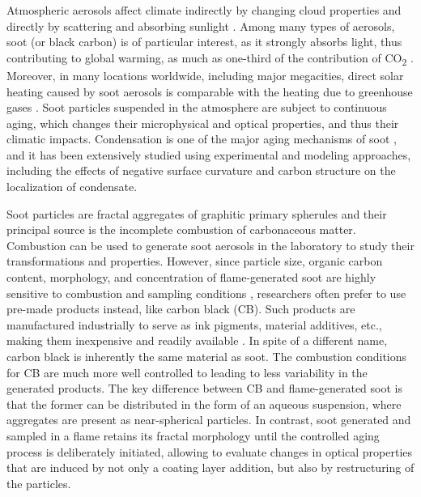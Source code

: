 Atmospheric aerosols affect climate indirectly by changing cloud properties \citep{lohmann2005global,tao2012impact} and directly by scattering and absorbing sunlight \citep{chylek1995effect}. Among many types of aerosols, soot (or black carbon) is of particular interest, as it strongly absorbs light, thus contributing to global warming, as much as one-third of the contribution of CO\textsubscript{2} \citep{RN21}. Moreover, in many locations worldwide, including major megacities, direct solar heating caused by soot aerosols is comparable with the heating due to greenhouse gases \citep{RN45}. Soot particles suspended in the atmosphere are subject to continuous aging, which changes their microphysical and optical properties, and thus their climatic impacts. Condensation is one of the major aging mechanisms of soot \citep{saathoff2003coating}, and it has been extensively studied using experimental and modeling approaches, including the effects of negative surface curvature \citep{RN70,ivanova2020kinetic} and carbon structure \citep{ivanova2022molecular} on the localization of condensate.







Soot particles are fractal aggregates of graphitic primary spherules and their principal source is the incomplete combustion of carbonaceous matter. Combustion can be used to generate soot aerosols in the laboratory to study their transformations and properties. However, since particle size, organic carbon content, morphology, and concentration of flame-generated soot are highly sensitive to combustion and sampling conditions \citep{RN46,RN47}, researchers often prefer to use pre-made products instead, like carbon black (CB). Such products are manufactured industrially to serve as ink pigments, material additives, etc., making them inexpensive and readily available \citep{RN12}. In spite of a different name, carbon black is inherently the same material as soot. The combustion conditions for CB are much more well controlled to leading to less variability in the generated products. The key difference between CB and flame-generated soot is that the former can be distributed in the form of an aqueous suspension, where aggregates are present as near-spherical particles. In contrast, soot generated and sampled in a flame retains its fractal morphology until the controlled aging process is deliberately initiated, allowing to evaluate changes in optical properties that are induced by not only a coating layer addition, but also by restructuring of the particles. 

